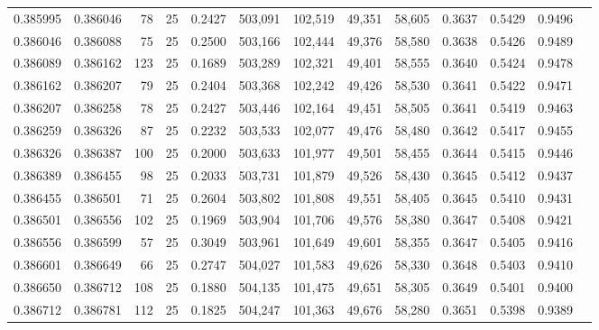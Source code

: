 \begin{tabular}{rrrrrrrrrrrrr}
0.385995 & 0.386046 &    78 &  25 &                                     0.2427 & 503,091 & 102,519 &  49,351 &  58,605 & 0.3637 & 0.5429 & 0.9496 \\
0.386046 & 0.386088 &    75 &  25 &                                     0.2500 & 503,166 & 102,444 &  49,376 &  58,580 & 0.3638 & 0.5426 & 0.9489 \\
0.386089 & 0.386162 &   123 &  25 &                                     0.1689 & 503,289 & 102,321 &  49,401 &  58,555 & 0.3640 & 0.5424 & 0.9478 \\
0.386162 & 0.386207 &    79 &  25 &                                     0.2404 & 503,368 & 102,242 &  49,426 &  58,530 & 0.3641 & 0.5422 & 0.9471 \\
0.386207 & 0.386258 &    78 &  25 &                                     0.2427 & 503,446 & 102,164 &  49,451 &  58,505 & 0.3641 & 0.5419 & 0.9463 \\
0.386259 & 0.386326 &    87 &  25 &                                     0.2232 & 503,533 & 102,077 &  49,476 &  58,480 & 0.3642 & 0.5417 & 0.9455 \\
0.386326 & 0.386387 &   100 &  25 &                                     0.2000 & 503,633 & 101,977 &  49,501 &  58,455 & 0.3644 & 0.5415 & 0.9446 \\
0.386389 & 0.386455 &    98 &  25 &                                     0.2033 & 503,731 & 101,879 &  49,526 &  58,430 & 0.3645 & 0.5412 & 0.9437 \\
0.386455 & 0.386501 &    71 &  25 &                                     0.2604 & 503,802 & 101,808 &  49,551 &  58,405 & 0.3645 & 0.5410 & 0.9431 \\
0.386501 & 0.386556 &   102 &  25 &                                     0.1969 & 503,904 & 101,706 &  49,576 &  58,380 & 0.3647 & 0.5408 & 0.9421 \\
0.386556 & 0.386599 &    57 &  25 &                                     0.3049 & 503,961 & 101,649 &  49,601 &  58,355 & 0.3647 & 0.5405 & 0.9416 \\
0.386601 & 0.386649 &    66 &  25 &                                     0.2747 & 504,027 & 101,583 &  49,626 &  58,330 & 0.3648 & 0.5403 & 0.9410 \\
0.386650 & 0.386712 &   108 &  25 &                                     0.1880 & 504,135 & 101,475 &  49,651 &  58,305 & 0.3649 & 0.5401 & 0.9400 \\
0.386712 & 0.386781 &   112 &  25 &                                     0.1825 & 504,247 & 101,363 &  49,676 &  58,280 & 0.3651 & 0.5398 & 0.9389 \\

\end{tabular}
